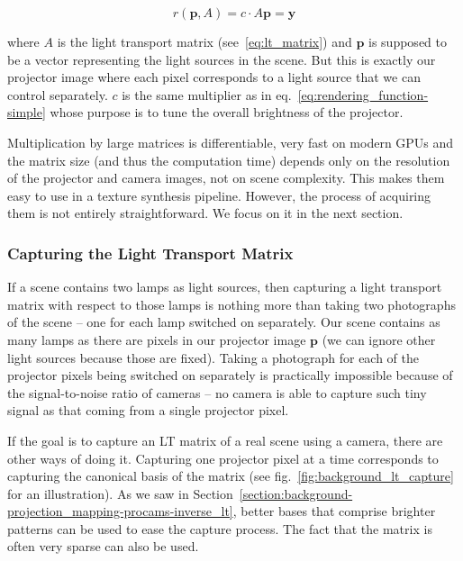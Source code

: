 \begin{equation}
    \label{eq:rendering_function-lt_matrix}
    r(\bm{p}, A) = c \cdot A\bm{p} = \bm{y}
\end{equation}

where \(A\) is the light transport matrix (see~\ref{eq:lt_matrix}) and \(\bm{p}\) is supposed to be a vector representing the light sources in the scene. But this is exactly our projector image where each pixel corresponds to a light source that we can control separately. \(c\) is the same multiplier as in eq.~\ref{eq:rendering_function-simple} whose purpose is to tune the overall brightness of the projector.

Multiplication by large matrices is differentiable, very fast on modern GPUs and the matrix size (and thus the computation time) depends only on the resolution of the projector and camera images, not on scene complexity. This makes them easy to use in a texture synthesis pipeline. However, the process of acquiring them is not entirely straightforward. We focus on it in the next section.

\subsubsection{Capturing the Light Transport Matrix}
\label{section:methods-rendering_function-general-lt_capture}

If a scene contains two lamps as light sources, then capturing a light transport matrix with respect to those lamps is nothing more than taking two photographs of the scene -- one for each lamp switched on separately. Our scene contains as many lamps as there are pixels in our projector image \(\bm{p}\) (we can ignore other light sources because those are fixed). Taking a photograph for each of the projector pixels being switched on separately is practically impossible because of the signal-to-noise ratio of cameras -- no camera is able to capture such tiny signal as that coming from a single projector pixel.

If the goal is to capture an LT matrix of a real scene using a camera, there are other ways of doing it. Capturing one projector pixel at a time corresponds to capturing the canonical basis of the matrix (see fig.~\ref{fig:background_lt_capture} for an illustration). As we saw in Section~\ref{section:background-projection_mapping-procams-inverse_lt}, better bases that comprise brighter patterns can be used to ease the capture process. The fact that the matrix is often very sparse can also be used.

